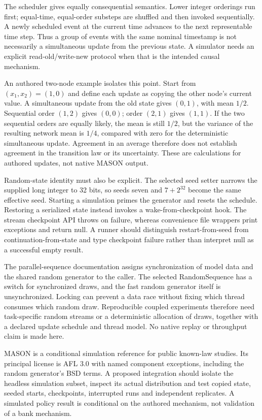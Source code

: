 The scheduler gives equally consequential semantics. Lower integer orderings run first; equal-time, equal-order substeps are shuffled and then invoked sequentially. A newly scheduled event at the current time advances to the next representable time step. Thus a group of events with the same nominal timestamp is not necessarily a simultaneous update from the previous state. A simulator needs an explicit read-old/write-new protocol when that is the intended causal mechanism.~\citep{exec25_jnet_mason}

An authored two-node example isolates this point. Start from $(x_1,x_2)=(1,0)$ and define each update as copying the other node's current value. A simultaneous update from the old state gives $(0,1)$, with mean $1/2$. Sequential order $(1,2)$ gives $(0,0)$; order $(2,1)$ gives $(1,1)$. If the two sequential orders are equally likely, the mean is still $1/2$, but the variance of the resulting network mean is $1/4$, compared with zero for the deterministic simultaneous update. Agreement in an average therefore does not establish agreement in the transition law or its uncertainty. These are calculations for authored updates, not native MASON output.~\citep{exec25_jnet_choice}

Random-state identity must also be explicit. The selected seed setter narrows the supplied long integer to 32 bits, so seeds seven and $7+2^{32}$ become the same effective seed. Starting a simulation primes the generator and resets the schedule. Restoring a serialized state instead invokes a wake-from-checkpoint hook. The stream checkpoint API throws on failure, whereas convenience file wrappers print exceptions and return null. A runner should distinguish restart-from-seed from continuation-from-state and type checkpoint failure rather than interpret null as a successful empty result.~\citep{exec25_jnet_mason,exec25_jnet_choice}

The parallel-sequence documentation assigns synchronization of model data and the shared random generator to the caller. The selected RandomSequence has a switch for synchronized draws, and the fast random generator itself is unsynchronized. Locking can prevent a data race without fixing which thread consumes which random draw. Reproducible coupled experiments therefore need task-specific random streams or a deterministic allocation of draws, together with a declared update schedule and thread model. No native replay or throughput claim is made here.~\citep{exec25_jnet_mason}

MASON is a conditional simulation reference for public known-law studies. Its principal license is AFL 3.0 with named component exceptions, including the random generator's BSD terms. A proposed integration should isolate the headless simulation subset, inspect its actual distribution and test copied state, seeded starts, checkpoints, interrupted runs and independent replicates. A simulated policy result is conditional on the authored mechanism, not validation of a bank mechanism.~\citep{exec25_jnet_mason,exec25_jnet_choice}

